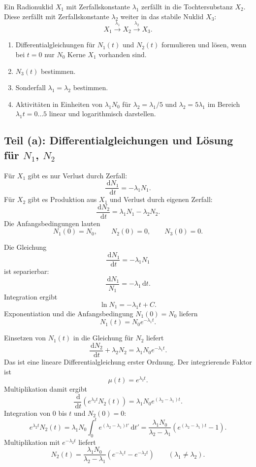 \documentclass[11pt,a4paper]{scrartcl}
\newcommand{\paren}[1]{\left( #1 \right)}
\newcommand{\dd}{\,\mathrm{d}}
\newcommand{\dv}[2]{\frac{\dd #1}{\dd #2}}
\theoremstyle{definition}
\theoremstyle{plain}
\theoremstyle{remark}
\begin{document}
\begin{taskbox}
Ein Radionuklid $X_1$ mit Zerfallskonstante $\lambda_1$ zerfällt in die Tochtersubstanz $X_2$. Diese zerfällt mit Zerfallskonstante $\lambda_2$ weiter in das stabile Nuklid $X_3$:
\[
    X_1 \xrightarrow{\lambda_1} X_2 \xrightarrow{\lambda_2} X_3.
\]
\begin{enumerate}[label=(\alph*)]
    \item Differentialgleichungen für $N_1(t)$ und $N_2(t)$ formulieren und lösen, wenn bei $t=0$ nur $N_0$ Kerne $X_1$ vorhanden sind.
    \item $N_3(t)$ bestimmen.
    \item Sonderfall $\lambda_1=\lambda_2$ bestimmen.
    \item Aktivitäten in Einheiten von $\lambda_1N_0$ für $\lambda_2=\lambda_1/5$ und $\lambda_2=5\lambda_1$ im Bereich $\lambda_1t=0\dots 5$ linear und logarithmisch darstellen.
\end{enumerate}
\end{taskbox}

\subsection{Teil (a): Differentialgleichungen und Lösung für $N_1$, $N_2$}

\begin{calculationbox}[title=Differentialgleichungen]
Für $X_1$ gibt es nur Verlust durch Zerfall:
\[
    \dv{N_1}{t}=-\lambda_1N_1.
\]
Für $X_2$ gibt es Produktion aus $X_1$ und Verlust durch eigenen Zerfall:
\[
    \dv{N_2}{t}=\lambda_1N_1-\lambda_2N_2.
\]
Die Anfangsbedingungen lauten
\[
    N_1(0)=N_0,
    \qquad
    N_2(0)=0,
    \qquad
    N_3(0)=0.
\]
\end{calculationbox}

\begin{calculationbox}[title=Lösung für $N_1(t)$]
Die Gleichung
\[
    \dv{N_1}{t}=-\lambda_1N_1
\]
ist separierbar:
\[
    \frac{\dd N_1}{N_1}=-\lambda_1\dd t.
\]
Integration ergibt
\[
    \ln N_1=-\lambda_1t+C.
\]
Exponentiation und die Anfangsbedingung $N_1(0)=N_0$ liefern
\[
    \boxed{N_1(t)=N_0e^{-\lambda_1t}}.
\]
\end{calculationbox}

\begin{calculationbox}[title=Lösung für $N_2(t)$ bei $\lambda_1\neq \lambda_2$]
Einsetzen von $N_1(t)$ in die Gleichung für $N_2$ liefert
\[
    \dv{N_2}{t}+\lambda_2N_2=\lambda_1N_0e^{-\lambda_1t}.
\]
Das ist eine lineare Differentialgleichung erster Ordnung. Der integrierende Faktor ist
\[
    \mu(t)=e^{\lambda_2t}.
\]
Multiplikation damit ergibt
\[
    \dv{}{t}\paren{e^{\lambda_2t}N_2(t)}
    =\lambda_1N_0e^{(\lambda_2-\lambda_1)t}.
\]
Integration von $0$ bis $t$ und $N_2(0)=0$:
\[
    e^{\lambda_2t}N_2(t)
    =\lambda_1N_0\int_0^t e^{(\lambda_2-\lambda_1)t'}\dd t'
    =\frac{\lambda_1N_0}{\lambda_2-\lambda_1}\paren{e^{(\lambda_2-\lambda_1)t}-1}.
\]
Multiplikation mit $e^{-\lambda_2t}$ liefert
\[
    \boxed{
    N_2(t)=\frac{\lambda_1N_0}{\lambda_2-\lambda_1}
    \paren{e^{-\lambda_1t}-e^{-\lambda_2t}}
    }
    \qquad (\lambda_1\neq\lambda_2).
\]
\end{calculationbox}
\end{document}
